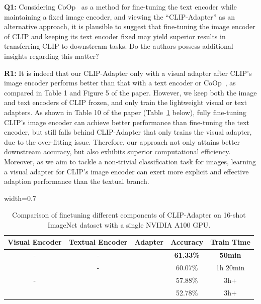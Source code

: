 \documentclass[default]{sn-jnl}%
\theoremstyle{thmstyleone}%
\theoremstyle{thmstyletwo}%
\theoremstyle{thmstylethree}%
\begin{document}
\textbf{Q1:} Considering CoOp~\cite{zhou2021coop} as a method for fine-tuning the text encoder while maintaining a fixed image encoder, and viewing the ``CLIP-Adapter'' as an alternative approach, it is plausible to suggest that fine-tuning the image encoder of CLIP and keeping its text encoder fixed may yield superior results in transferring CLIP to downstream tasks. Do the authors possess additional insights regarding this matter?

\vspace{0.1cm}
\noindent\textbf{R1:} It is indeed that our CLIP-Adapter only with a visual adapter after CLIP's image encoder performs better than that with a text encoder or CoOp~\cite{zhou2021coop}, as compared in Table 1 and Figure 5 of the paper. However, we keep both the image and text encoders of CLIP frozen, and only train the lightweight visual or text adapters. As shown in Table 10 of the paper (Table~\ref{tab:finetune} below), fully fine-tuning CLIP's image encoder can achieve better performance than fine-tuning the text encoder, but still falls behind CLIP-Adapter that only trains the visual adapter, due to the over-fitting issue. Therefore, our approach not only attains better downstream accuracy, but also exhibits superior computational efficiency. Moreover, as we aim to tackle a non-trivial classification task for images, learning a visual adapter for CLIP's image encoder can exert more explicit and effective adaption performance than the textual branch.

\begin{table}[h]
\centering
\caption{Comparison of finetuning different components of CLIP-Adapter on 16-shot ImageNet dataset with a single NVIDIA A100 GPU.}
\vspace*{5pt}
\begin{adjustbox}{width=0.7\linewidth}
	\begin{tabular}{ccccc}
	\toprule
		Visual Encoder &Textual Encoder
		 &Adapter &Accuracy & Train Time\\ \midrule
		- & - &\Checkmark &\textbf{61.33\%} &\textbf{50min}\\
		\Checkmark & - &\Checkmark &60.07\% &1h 20min\\
		- & \Checkmark &\Checkmark &57.88\% &3h+\\
	    \Checkmark & \Checkmark & \Checkmark & 52.78\% &3h+\\
	\bottomrule
	\end{tabular}
\end{adjustbox}
\label{tab:finetune}
\end{table}
\end{document}
